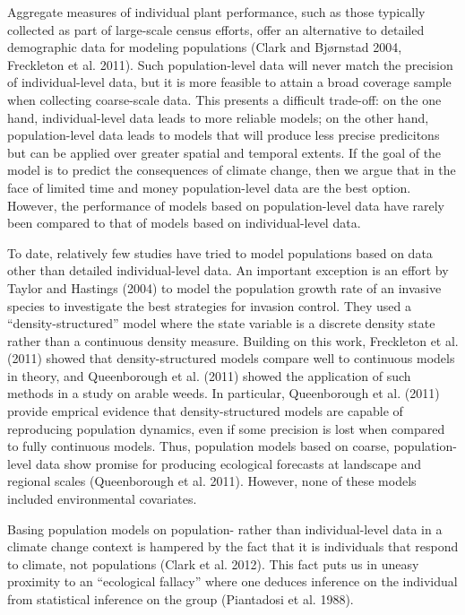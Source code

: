 \documentclass[12pt,]{article}
\begin{document}
Aggregate measures of individual plant performance, such as those
typically collected as part of large-scale census efforts, offer an
alternative to detailed demographic data for modeling populations (Clark
and Bjørnstad 2004, Freckleton et al. 2011). Such population-level data
will never match the precision of individual-level data, but it is more
feasible to attain a broad coverage sample when collecting coarse-scale
data. This presents a difficult trade-off: on the one hand,
individual-level data leads to more reliable models; on the other hand,
population-level data leads to models that will produce less precise
predicitons but can be applied over greater spatial and temporal
extents. If the goal of the model is to predict the consequences of
climate change, then we argue that in the face of limited time and money
population-level data are the best option. However, the performance of
models based on population-level data have rarely been compared to that
of models based on individual-level data.

To date, relatively few studies have tried to model populations based on
data other than detailed individual-level data. An important exception
is an effort by Taylor and Hastings (2004) to model the population
growth rate of an invasive species to investigate the best strategies
for invasion control. They used a ``density-structured'' model where the
state variable is a discrete density state rather than a continuous
density measure. Building on this work, Freckleton et al. (2011) showed
that density-structured models compare well to continuous models in
theory, and Queenborough et al. (2011) showed the application of such
methods in a study on arable weeds. In particular, Queenborough et al.
(2011) provide emprical evidence that density-structured models are
capable of reproducing population dynamics, even if some precision is
lost when compared to fully continuous models. Thus, population models
based on coarse, population-level data show promise for producing
ecological forecasts at landscape and regional scales (Queenborough et
al. 2011). However, none of these models included environmental
covariates.

Basing population models on population- rather than individual-level
data in a climate change context is hampered by the fact that it is
individuals that respond to climate, not populations (Clark et al.
2012). This fact puts us in uneasy proximity to an ``ecological
fallacy'' where one deduces inference on the individual from statistical
inference on the group (Piantadosi et al. 1988).
\end{document}
